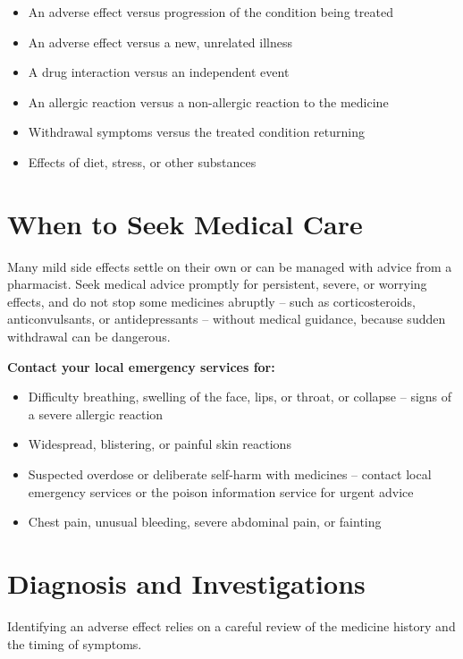 \begin{itemize}
    \item An adverse effect versus progression of the condition being treated
    \item An adverse effect versus a new, unrelated illness
    \item A drug interaction versus an independent event
    \item An allergic reaction versus a non-allergic reaction to the medicine
    \item Withdrawal symptoms versus the treated condition returning
    \item Effects of diet, stress, or other substances
\end{itemize}

\section*{When to Seek Medical Care}
Many mild side effects settle on their own or can be managed with advice from a pharmacist. Seek medical advice promptly for persistent, severe, or worrying effects, and do not stop some medicines abruptly -- such as corticosteroids, anticonvulsants, or antidepressants -- without medical guidance, because sudden withdrawal can be dangerous.

\textbf{Contact your local emergency services for:}
\begin{itemize}
    \item Difficulty breathing, swelling of the face, lips, or throat, or collapse -- signs of a severe allergic reaction
    \item Widespread, blistering, or painful skin reactions
    \item Suspected overdose or deliberate self-harm with medicines -- contact local emergency services or the poison information service for urgent advice
    \item Chest pain, unusual bleeding, severe abdominal pain, or fainting
\end{itemize}

\section*{Diagnosis and Investigations}
Identifying an adverse effect relies on a careful review of the medicine history and the timing of symptoms.

